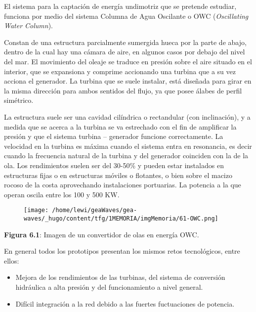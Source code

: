 El sistema para la captación de energía undimotriz que se pretende
estudiar, funciona por medio del sistema Columna de Agua Oscilante o OWC
(\emph{Oscillating Water Column}).

Constan de una estructura parcialmente sumergida hueca por la parte de
abajo, dentro de la cual hay una cámara de aire, en algunos casos por
debajo del nivel del mar. El movimiento del oleaje se traduce en presión
sobre el aire situado en el interior, que se expansiona y comprime
accionando una turbina que a su vez acciona el generador. La turbina que
se suele instalar, está diseñada para girar en la misma dirección para
ambos sentidos del flujo, ya que posee álabes de perfil simétrico.

La estructura suele ser una cavidad cilíndrica o rectandular (con
inclinación), y a medida que se acerca a la turbina se va estrechado con
el fin de amplificar la presión y que el sistema turbina -- generador
funcione correctamente. La velocidad en la turbina es máxima cuando el
sistema entra en resonancia, es decir cuando la frecuencia natural de la
turbina y del generador coinciden con la de la ola. Los rendimientos
suelen ser del 30-50\% y pueden estar instalados en estructuras fijas o
en estructuras móviles o flotantes, o bien sobre el macizo rocoso de la
costa aprovechando instalaciones portuarias. La potencia a la que operan
oscila entre los 100 y 500 KW.

\begin{figure}
\centering
\texttt{[image: /home/lewi/geaWaves/gea-waves/\_hugo/content/tfg/1MEMORIA/imgMemoria/61-OWC.png]}
\caption{}
\end{figure}

\textbf{Figura 6.1}: Imagen de un convertidor de olas en energía OWC.

En general todos los prototipos presentan los mismos retos tecnológicos,
entre ellos:

\begin{itemize}
\item
  Mejora de los rendimientos de las turbinas, del sistema de conversión
  hidráulica a alta presión y del funcionamiento a nivel general. 
\item
  Difícil integración a la red debido a las fuertes fuctuaciones de
  potencia.
\end{itemize}
